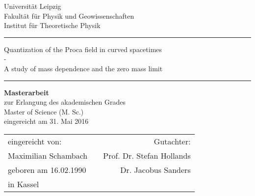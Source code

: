 \documentclass[12pt,a4paper,twoside]{scrartcl}
\renewcommand{\glossaryname}{Symbols}
\begin{document}




\begin{titlepage}
{\sffamily \centering
{
{\LARGE  {Universität Leipzig}}\\[2mm]
{\large {Fakultät für Physik und Geowissenschaften}}\\[2mm]
{\large {Institut für Theoretische Physik}}\\[2cm]
\textcolor{black}{\hrule height 1pt} \vspace{2.5mm}
}
{\LARGE \noindent
{Quantization of the Proca field in curved spacetimes\\  - \\A study of mass dependence and the zero mass limit}
\vspace{3.5mm}
\textcolor{black}{\hrule height 1pt}
\par}
{
\vspace{2cm}
{\huge \textbf {Masterarbeit}}\\[3mm]
{\large {zur Erlangung des akademischen Grades}}\\[2mm]
{\large {Master of Science (M. Sc.)}}\\[2mm]
{\large {eingereicht am 31. Mai 2016}}
}

\vspace{9cm}



  {
\begin{tabularx}{\textwidth}{lXr}
eingereicht von: & & Gutachter: \\
Maximilian Schambach & & Prof. Dr. Stefan Hollands \\
geboren am 16.02.1990 & & Dr. Jacobus Sanders \\
in Kassel & &
\end{tabularx}
  }
}
\end{titlepage}








\clearpage{\pagestyle{empty}\cleardoublepage}
\newpage
\clearpage
{}
\onehalfspacing

\newpage
\clearpage{\pagestyle{empty}\cleardoublepage}
\newpage
\clearpage \singlespacing
\tableofcontents
\newpage
\clearpage{\pagestyle{empty}\cleardoublepage}
\newpage
\clearpage
\pagestyle{fancy}

\end{document}
